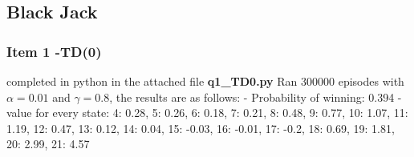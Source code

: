 \documentclass{article} %
\begin{document}
\subsection{Black Jack}
\subsubsection{Item 1 -\textbf{TD(0)}}
completed in python in the attached file \textbf{q1\_TD0.py}
\newline
Ran 300000 episodes with $\alpha = 0.01$ and $\gamma = 0.8$, the results are as follows:
\newline \newline
- Probability of winning: 0.394
\newline
- value for every state: {4: 0.28, 5: 0.26, 6: 0.18, 7: 0.21, 8: 0.48, 9: 0.77, 10: 1.07, 11: 1.19, 12: 0.47, 13: 0.12, 14: 0.04, 15: -0.03, 16: -0.01, 17: -0.2, 18: 0.69, 19: 1.81, 20: 2.99, 21: 4.57}
\end{document}
